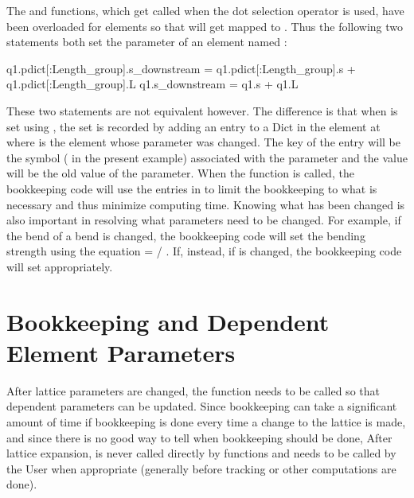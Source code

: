 The  and  functions, which get called when the dot
selection operator is used, have been overloaded for elements so that  will get mapped to 
. Thus the following two statements both set the 
parameter of an element named :
\begin{example}
  q1.pdict[:Length_group].s_downstream = q1.pdict[:Length_group].s + 
                                                     q1.pdict[:Length_group].L
  q1.s_downstream = q1.s + q1.L
\end{example}
These two statements are not equivalent however. The difference is that when 
is set using , the set is recorded by adding an entry to a 
Dict in the element at  where  is the element whose parameter
was changed. The key of the entry will be the symbol ( in the present example)
associated with the parameter and the value will be the old value of the parameter. When
the  function is called, the bookkeeping code will use the
entries in  to limit the bookkeeping to what is necessary and thus
minimize computing time. Knowing what has been changed is also important in resolving what
parameters need to be changed. 
For example, if the bend  of a bend is changed, the bookkeeping code will set the 
bending strength  using the equation  =  / . If, instead, if
 is changed, the bookkeeping code will set  appropriately. 



\section{Bookkeeping and Dependent Element Parameters}
\label{s:param.depend}

After lattice parameters are changed, the function  needs to be called
so that dependent parameters can be updated. 
Since bookkeeping can take a significant amount of time if bookkeeping is done every time
a change to the lattice is made, and since there is no good way to tell when bookkeeping should
be done, After lattice expansion,  is never called directly by \accellat functions and needs to be called by the User when appropriate (generally before tracking or
other computations are done).

